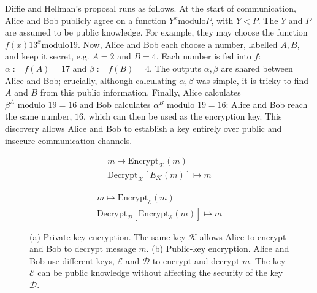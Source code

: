 Diffie and Hellman's proposal runs as follows. At the start of communication, Alice and Bob publicly agree on a function $Y^x \text{modulo} P$, with $Y < P$. The $Y$ and $P$ are assumed to be public knowledge. For example, they may choose the function $f\left(x\right) 13^x \text{modulo} 19$. Now, Alice and Bob each choose a number, labelled $A, B$, and keep it secret, e.g. $A = 2$ and $B = 4$. Each number is fed into $f$: $\alpha :=f\left(A\right) = 17$ and $\beta := f\left(B\right) = 4$. The outputs $\alpha, \beta$ are shared between Alice and Bob; crucially, although calculating $\alpha, \beta$ was simple, it is tricky to find $A$ and $B$ from this public information. Finally, Alice calculates $\beta^A \text{ modulo } 19 = 16$ and Bob calculates $\alpha^B \text{ modulo } 19 = 16$: Alice and Bob reach the same number, $16$, which can then be used as the encryption key. This discovery allows Alice and Bob to establish a key entirely over public and insecure communication channels. 



\begin{figure}[htp]
\centering
\captionsetup{width=\linewidth}
\begin{framed}
\begin{subfigure}{0.4\textwidth}
\begin{align*}
m \mapsto \text{Encrypt}_\mathcal{K}\left(m\right) \\
\text{Decrypt}_\mathcal{K}\left[E_\mathcal{K}\left(m\right)\right] \mapsto m
\end{align*}
\caption{}
\end{subfigure}
\begin{subfigure}{0.4\textwidth}
\begin{align*}
m \mapsto \text{Encrypt}_\mathcal{E}\left(m\right) \\
\text{Decrypt}_\mathcal{D}\left[\text{Encrypt}_\mathcal{E}\left(m\right)\right] \mapsto m
\end{align*}
\caption{}
\end{subfigure}
\caption{(a) Private-key encryption. The same key $\mathcal{K}$ allows Alice to encrypt and Bob to decrypt message $m$. (b) Public-key encryption. Alice and Bob use different keys, $\mathcal{E}$ and $\mathcal{D}$ to encrypt and decrypt $m$. The key $\mathcal{E}$ can be public knowledge without affecting the security of the key $\mathcal{D}$.}
\label{fig:pubpriv}
\end{framed}
\end{figure}


